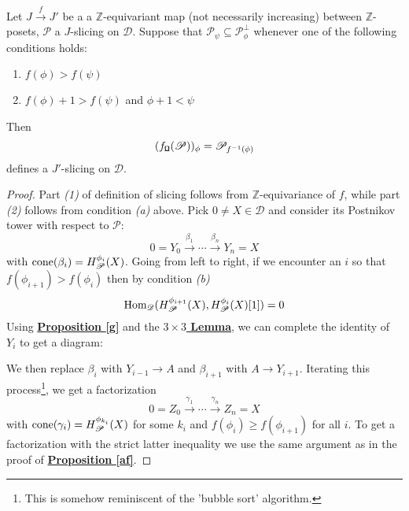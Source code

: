 \begin{prop}\label{pipp}
Let $J \overset{f}{\longrightarrow} J'$ be a a $\mathbb{Z}$-equivariant map (not necessarily increasing) between $\mathbb{Z}$-posets, $\mathscr{P}$ a $J$-slicing on $\mathscr{D}$. Suppose that $\mathscr{P}_{\psi} \subseteq \mathscr{P}_{\phi}^{\perp}$ whenever one of the following conditions holds: 
\begin{enumerate}[label=(\alph*)]
\item $f(\phi) > f(\psi)$
\item $f(\phi) + 1 > f(\psi)$ and $\phi +1 < \psi$
\end{enumerate}
Then $$(f_{\textnormal{\Libra}}(\mathscr{P}))_{\phi}=\mathscr{P}_{f^{-1}(\phi)}$$
defines a $J'$-slicing on $\mathscr{D}$.
\end{prop}

\begin{proof}
Part \textit{(1)} of definition of slicing follows from $\mathbb{Z}$-equivariance of $f$, while part \textit{(2)} follows from condition \textit{(a)} above. Pick $0 \not = X \in \mathscr{D}$ and consider its Postnikov tower with respect to $\mathscr{P}$: $$0=Y_0 \overset{\beta_1}{\longrightarrow} \cdots \overset{\beta_n}{\longrightarrow} Y_n=X$$
with $\textnormal{cone}(\beta_i)=H_{\mathscr{P}}^{\phi_i}(X)$. Going from left to right, if we encounter an $i$ so that $f(\phi_{i+1}) > f(\phi_i)$ then by condition \textit{(b)} $$\textnormal{Hom}_{\mathscr{D}}(H_{\mathscr{P}}^{\phi_{i+1}}(X),H_{\mathscr{P}}^{\phi_i}(X)[1])=0$$
Using \hyperref[g]{\textbf{Proposition \ref*{g}}} and the \hyperref[s]{\textbf{$3 \times 3$ Lemma}}, we can complete the identity of $Y_i$ to get a diagram: 
\begin{center}
\end{center}

We then replace $\beta_i$ with $Y_{i-1} \longrightarrow A$ and $\beta_{i+1}$ with $A \longrightarrow Y_{i+1}$. Iterating this process\footnote{This is somehow reminiscent of the 'bubble sort' algorithm.}, we get a factorization $$0=Z_0 \overset{\gamma_1}{\longrightarrow} \cdots \overset{\gamma_n}{\longrightarrow} Z_n=X$$
with $\textnormal{cone}(\gamma_i)=H_{\mathscr{P}}^{\phi_{k_i}}(X)$ for some $k_i$ and $f(\phi_i) \ge f(\phi_{i+1})$ for all $i$. To get a factorization with the strict latter inequality we use the same argument as in the proof of \hyperref[af]{\textbf{Proposition \ref*{af}}}.
\end{proof}

